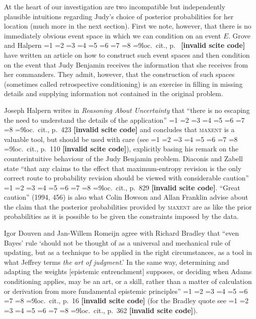 \documentclass[12pt]{article}
\newcommand{\qeins}[1]{``#1''}
\newcommand{\qzwei}[1]{`#1'}
\newif\ifNumericalOrYear
\newcommand{\PageP}{p.~}
\newcommand{\PageP}{}
\newcommand{\scite}[3]{\ifnum#1=1\ifNumericalOrYear\citep{#2}\else\citeyearpar{#2}\fi\else
\ifnum#1=2\ifNumericalOrYear\citep[#3]{#2}\else\citep[{\PageP}#3]{#2}\fi\else
\ifnum#1=3\ifNumericalOrYear(\citet[#3]{#2})\else\citep[{\PageP}#3]{#2}\fi\else
\ifnum#1=4\ifNumericalOrYear\citet{#2}\else\citet{#2}\fi\else
\ifnum#1=5\ifNumericalOrYear(\citet{#2})\else\citep{#2}\fi\else
\ifnum#1=6\ifNumericalOrYear(\citet[#3]{#2})\else\citep[{\PageP}#3]{#2}\fi\else
\ifnum#1=7\ifNumericalOrYear\citep{#2}\else\citealp{#2}\fi\else
\ifnum#1=8\ifNumericalOrYear\citep[#3]{#2}\else\citealp[{\PageP}#3]{#2}\fi\else
\ifnum#1=9\ifNumericalOrYear\citep[#3]{#2}\else{}loc.\ cit., {\PageP}#3\fi\else
\textbf{[invalid scite code]}\fi\fi\fi\fi\fi\fi\fi\fi\fi}
\begin{document}
At the heart of our investigation are two incompatible but
independently plausible intuitions regarding Judy's choice of
posterior probabilities for her location (much more in the next
section). First we note, however, that there is no immediately obvious
event space in which we can condition on an event $E$. Grove and
Halpern \scite{1}{grovehalpern97}{} have written an article on how to
construct such event spaces and then condition on the event that Judy
Benjamin receives the information that she receives from her
commanders. They admit, however, that the construction of such spaces
(sometimes called retrospective conditioning) is an exercise in
filling in missing details and supplying information not contained in
the original problem.

Joseph Halpern writes in \emph{Reasoning About Uncertainty} that
\qeins{there is no escaping the need to understand the details of the
  application} \scite{2}{halpern03}{423} and concludes that
\textsc{maxent} is a valuable tool, but should be used with care (see
\scite{8}{grovehalpern97}{110}), explicitly basing his remark on the
counterintuitive behaviour of the Judy Benjamin problem. Diaconis and
Zabell state \qeins{that any claims to the effect that maximum-entropy
  revision is the only correct route to probability revision should be
  viewed with considerable caution} \scite{2}{diaconiszabell82}{829}.
\qeins{Great caution} (1994, 456) is also what Colin Howson and Allan
Franklin advise about the claim that the posterior probabilities
provided by \textsc{maxent} are as like the prior probabilities as it
is possible to be given the constraints imposed by the data.

Igor Douven and Jan-Willem Romeijn agree with Richard Bradley that
\qeins{even Bayes' rule \qzwei{should not be thought of as a universal
    and mechanical rule of updating, but as a technique to be applied
    in the right circumstances, as a tool in what Jeffrey terms
    \emph{the art of judgment}.} In the same way, determining and
  adapting the weights [epistemic entrenchment] supposes, or deciding
  when Adams conditioning applies, may be an art, or a skill, rather
  than a matter of calculation or derivation from more fundamental
  epistemic principles} \scite{2}{douvenromeijn09}{16} (for the
Bradley quote see \scite{8}{bradley05}{362}).
\end{document}
